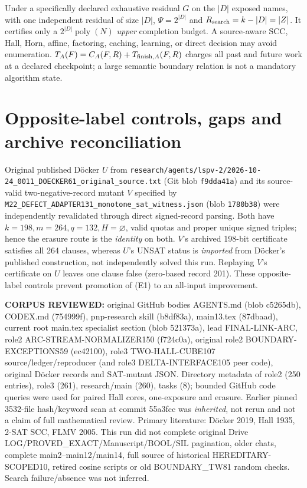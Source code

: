 \documentclass[11pt]{article}
\begin{document}
Under a specifically declared exhaustive residual $G$ on the $|D|$ exposed names, with one independent residual of size $|D|$, $\Psi=2^{|D|}$ and $R_{\rm search}=k-|D|=|Z|$. It certifies only a $2^{|D|}\operatorname{poly}(N)$ \emph{upper} completion budget. A source-aware SCC, Hall, Horn, affine, factoring, caching, learning, or direct decision may avoid enumeration. $T_A(F)=C_A(F,R)+T_{{\rm finish},A}(F,R)$ charges all past and future work at a declared checkpoint; a large semantic boundary relation is not a mandatory algorithm state.

\section{Opposite-label controls, gaps and archive reconciliation}
Original published D\"ocker $U$ from \texttt{research/agents/lspv-2/2026-10-24\_0011\_DOECKER61\_original\_source.txt} (Git blob \texttt{f9dda41a}) and its source-valid two-negative-record mutant $V$ specified by \texttt{M22\_DEFECT\_ADAPTER131\_monotone\_sat\_witness.json} (blob \texttt{1780b38}) were independently revalidated through direct signed-record parsing. Both have $k=198,m=264,q=132,H=\varnothing$, valid quotas and proper unique signed triples; hence the erasure route is the \emph{identity} on both. $V$'s archived 198-bit certificate satisfies all 264 clauses, whereas $U$'s UNSAT status is \emph{imported} from D\"ocker's published construction, not independently solved this run. Replaying $V$'s certificate on $U$ leaves one clause false (zero-based record 201). These opposite-label controls prevent promotion of (E1) to an all-input improvement.

\noindent\textbf{CORPUS REVIEWED:} original GitHub bodies AGENTS.md (blob c5265db), CODEX.md (754999f), pnp-research skill (b8df83a), main13.tex (87dbaad), current root main.tex specialist section (blob 521373a), lead FINAL-LINK-ARC, role2 ARC-STREAM-NORMALIZER150 (f724c0a), original role2 BOUNDARY-EXCEPTIONS59 (ec42100), role3 TWO-HALL-CUBE107 source/ledger/reproducer (and role3 DELTA-INTERFACE105 peer code), original D\"ocker records and SAT-mutant JSON. Directory metadata of role2 (250 entries), role3 (261), research/main (260), tasks (8); bounded GitHub code queries were used for paired Hall cores, one-exposure and erasure. Earlier pinned 3532-file hash/keyword scan at commit 55a3fcc was \emph{inherited}, not rerun and not a claim of full mathematical review. Primary literature: D\"ocker 2019, Hall 1935, 2-SAT SCC, FLMV 2005. This run did not complete original Drive LOG/PROVED\_EXACT/Manuscript/BOOL/SIL pagination, older chats, complete main2--main12/main14, full source of historical HEREDITARY-SCOPED10, retired cosine scripts or old BOUNDARY\_TW81 random checks. Search failure/absence was not inferred.
\end{document}
